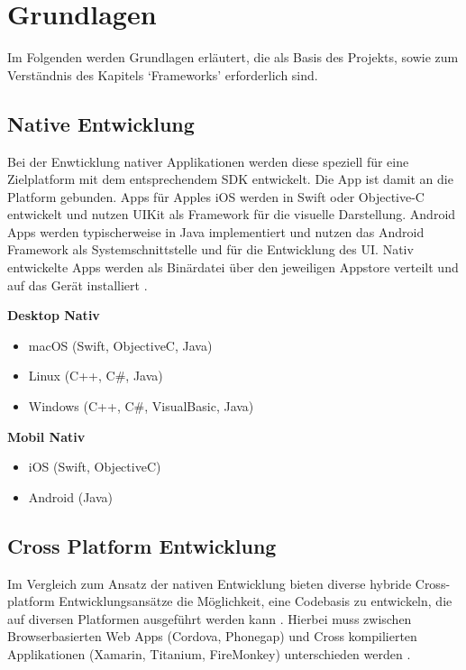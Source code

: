 
\chapter{Grundlagen}

Im Folgenden werden Grundlagen erläutert, die als Basis des Projekts, sowie zum Verständnis des Kapitels `Frameworks' erforderlich sind.


\section{Native Entwicklung}

Bei der Enwticklung nativer Applikationen werden diese speziell für eine Zielplatform mit dem entsprechendem \ac{SDK} entwickelt.
Die App ist damit an die Platform gebunden. Apps für Apples iOS werden in Swift oder Objective-C entwickelt und nutzen UIKit als Framework für die visuelle Darstellung.
Android Apps werden typischerweise in Java implementiert und nutzen das Android Framework als Systemschnittstelle und für die Entwicklung des \ac{UI}.
Nativ entwickelte Apps werden als Binärdatei über den jeweiligen Appstore verteilt und auf das Gerät installiert \cite{Heitkoetter2013}.

\vspace{1cm}
\textbf{Desktop Nativ}
\begin{itemize}
\item macOS (Swift, ObjectiveC, Java)
\item Linux (C++, C\#, Java)
\item Windows (C++, C\#, VisualBasic, Java)
\end{itemize}

\textbf{Mobil Nativ}
\begin{itemize}
\item iOS (Swift, ObjectiveC)
\item Android (Java)
\end{itemize}

\vspace{1cm}

\section{Cross Platform Entwicklung}

Im Vergleich zum Ansatz der nativen Entwicklung bieten diverse hybride Cross-platform Entwicklungsansätze die Möglichkeit, eine Codebasis zu entwickeln,
die auf diversen Platformen ausgeführt werden kann \cite{Heitkoetter2013}.
Hierbei muss zwischen Browserbasierten Web Apps (Cordova, Phonegap) und Cross kompilierten Applikationen (Xamarin, Titanium, FireMonkey) unterschieden werden
\cite{Xamar84:online}.

